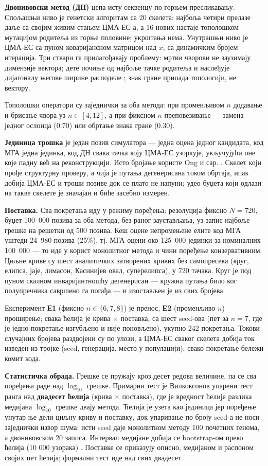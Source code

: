 \documentclass[
  conference,
  a4paper,
  10pt]{IEEEtran}
\begin{document}
\textbf{Двонивовски метод (ДН)} цепа исту секвенцу по горњем
пресликавању. Спољашњи ниво је генетски алгоритам са 20 скелета: најбоља
четири прелазе даље са својим живим стањем ЦМА-ЕС-а, а 16 нових настаје
тополошком мутацијом родитеља из горње половине; укрштања нема.
Унутрашњи ниво је ЦМА-ЕС \citep{hansen} са пуном коваријансном матрицом
над \(x\), са динамичким бројем итерација. Три ствари га прилагођавају
проблему: мртви чворови не заузимају димензије вектора; дете почиње од
најбоље тачке родитеља и наслеђује дијагоналу његове ширине расподеле
\citep{nomura}; знак гране припада топологији, не вектору.

Тополошки оператори су заједнички за оба метода: при променљивом \(n\)
додавање и брисање чвора уз \(n \in [4,12]\), а при фиксном \(n\)
преповезивање --- замена једног ослонца (0.70) или обртање знака гране
(0.30).

\textbf{Јединица трошка} је један позив симулатора --- једна оцена
једног кандидата, код МГА једна јединка, код ДН свака тачка коју ЦМА-ЕС
узоркује, укључујући оне које падну већ на реконструкцији. Исто бројање
користе Ong и сар. \citep{igbd}. Скелет који прође структурну проверу, а
чија је путања дегенерисана током обртаја, ипак добија ЦМА-ЕС и троши
позиве док се плато не напуни; удео буџета који одлази на такве скелете
је значајан и биће засебно измерен.

\textbf{Поставка.} Сва покретања иду у режиму поређења: резолуција
фиксно \(N = 720\), буџет 100~000 позива за оба метода, без раног
заустављања, уз запис најбоље грешке на решетки од 500 позива. Кеш оцене
непромењене елите код МГА уштеди 24~980 позива (25\%), тј. МГА оцени око
125~000 јединки за номиналних 100~000 --- то иде у корист монолитног
метода и чини поређење конзервативним. Циљне криве су шест аналитичких
затворених кривих без самопресека (круг, елипса, јаје, лимасон,
Касинијев овал, суперелипса), у 720 тачака. Круг је под пуном скалном
инваријантношћу дегенерисан --- кружна путања било ког полупречника
савршено га погађа --- и изостављен је из свих бројева.

Експеримент \textbf{Е1} (фиксно \(n \in \{6,7,8\}\)) је пренос,
\textbf{Е2} (променљиво \(n\)) проширење; свака ћелија је крива ×
поставка, са шест seed-ова (пет за \(n=7\), где је једно покретање
изгубљено и није поновљено), укупно 242 покретања. Токови случајних
бројева раздвојени су по улози, а ЦМА-ЕС сваког скелета добија ток
изведен из тројке (seed, генерација, место у популацији); свако
покретање бележи комит кода.

\textbf{Статистичка обрада.} Грешке се пружају кроз десет редова
величине, па се сва поређења раде над \(\log_{10}\) грешке. Примарни
тест је Вилкоксонов упарени тест ранга \citep{wilcoxon} над
\textbf{двадесет ћелија} (крива × поставка), где је вредност ћелије
разлика медијана \(\log_{10}\) грешке двају метода. Ћелија је узета као
јединица јер поређење унутар ње дели циљну криву и поставку, док
упаривање по броју seed-а не носи заједнички извор шума: исти seed даје
монолитном методу 100 почетних генома, а двонивовском 20 записа.
Интервал медијане добија се bootstrap-ом преко ћелија (10 000 узорака)
\citep{efron}. Поставке се приказују описно, медијаном и распоном својих
пет ћелија; формални тест иде над свих двадесет.
\end{document}
